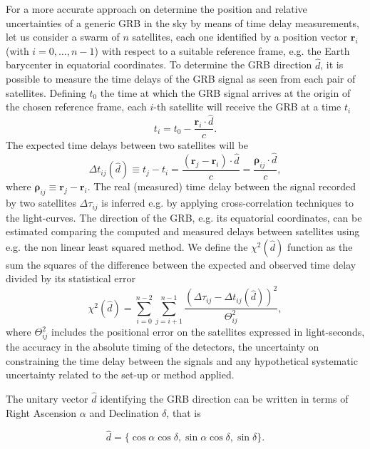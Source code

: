\documentclass[]{spie}  %
\renewcommand\vec{\bm}
\begin{document}
For a more accurate approach on determine the position and relative uncertainties of a generic GRB in the sky by means of time delay measurements, let us consider a swarm of $n$ satellites, each one identified by a position vector $\vec{r}_i$ (with $i=0,\dots, n-1$) with respect to a suitable reference frame, e.g. the Earth barycenter in equatorial coordinates.
To determine the GRB direction $\hat{d}$, it is possible to measure the time delays of the GRB signal as seen from each pair of  satellites. 
Defining $t_0$ the time at which the GRB signal arrives at the origin of the chosen reference frame, each $i$-th satellite will receive the GRB at a time $t_i$
\begin{equation}
  t_i = t_0 - \frac{\vec{r}_i \cdot \hat{d}}{c}.
\end{equation}
The expected time delays between two satellites will be
\begin{equation}
    \Delta t_{ij}(\hat{d}) \equiv t_j - t_i = \frac{(\vec{r}_j - \vec{r}_i) \cdot \hat{d}}{c} =  \frac{\vec{\rho}_{ij} \cdot \hat{d}}{c},
\label{eq:delayexp}
\end{equation}
where $\vec{\rho}_{ij} \equiv \vec{r}_j - \vec{r}_i$.
The real (measured) time delay between the signal recorded by two satellites $\Delta \tau_{ij}$ is inferred e.g. by applying cross-correlation techniques to the light-curves.
The direction of the GRB, e.g. its equatorial coordinates, can be estimated comparing the computed and measured delays between satellites using e.g. the non linear least squared method.
We define the $\chi^2(\hat{d})$ function as the sum the squares of the difference between the expected and observed time delay divided by its statistical error
  \begin{equation}
    \chi^2(\hat{d}) = \sum_{i = 0}^{n - 2}\sum_{j = i + 1}^{n - 1} \frac{(\Delta \tau_{ij} - \Delta t_{ij}(\hat{d}))^2}{\Theta_{ij}^2},
    \label{eq:chisq}
  \end{equation}
where $\Theta_{ij}^2$ includes the positional error on the satellites expressed in light-seconds, the accuracy in the absolute timing of the detectors, the uncertainty on constraining the time delay between the signals and any hypothetical systematic uncertainty related to the set-up or method applied.
  
The unitary vector $\hat{d}$ identifying the GRB direction can be written in terms of Right Ascension $\alpha$ and Declination $\delta$, that is
  
  \begin{equation}
    \hat{d} = \{\cos{\alpha} \cos{\delta}, \sin{\alpha} \cos{\delta}, \sin{\delta}\}.
  \end{equation}
\end{document}
